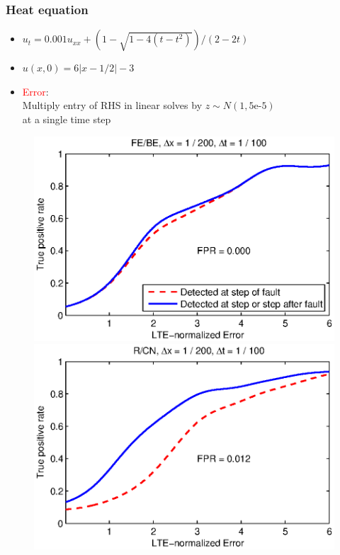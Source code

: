 \documentclass{beamer}
\begin{document}
\begin{frame}
\frametitle{Heat equation}

\begin{itemize}
\item  $u_t = 0.001u_{xx} + (1 - \sqrt{1 - 4(t - t^2)}) / (2 - 2t)$
\item  $u(x, 0) = 6|x - 1/2| - 3$
\item \textcolor{red}{Error}: \\
Multiply entry of RHS in linear solves by $z \sim N(1, 5\text{e-5})$ \\
at a single time step
\end{itemize}

\vspace{-0.5cm}
\begin{figure}
  \includegraphics[scale=0.5]{figs/heat_2a_BE.eps}
  \includegraphics[scale=0.5]{figs/heat_2a_CN.eps}
\end{figure}

\end{frame}
\end{document}
